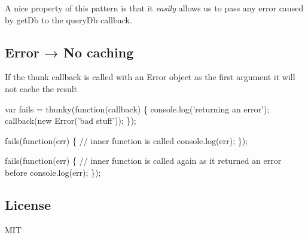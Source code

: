 A nice property of this pattern is that it {\itshape easily} allows us to pass any error caused by {\ttfamily get\+Db} to the {\ttfamily query\+Db} callback.

\subsection*{Error → No caching}

If the thunk callback is called with an {\ttfamily Error} object as the first argument it will not cache the result


\begin{DoxyCode}
var fails = thunky(function(callback) \{
    console.log('returning an error');
    callback(new Error('bad stuff'));
\});

fails(function(err) \{ // inner function is called
    console.log(err);
\});

fails(function(err) \{ // inner function is called again as it returned an error before
    console.log(err);
\});
\end{DoxyCode}


\subsection*{License}

M\+IT 